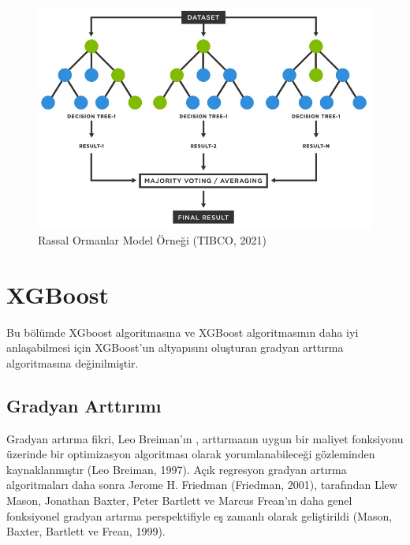 \documentclass[12pt,twoside]{deuthesis}
\begin{document}
\begin{figure}

{\centering \includegraphics[width=1\linewidth,height=0.48\textheight]{figure/rf_example} 

}

\caption{Rassal Ormanlar Model Örneği (TIBCO, 2021)}\label{fig:unnamed-chunk-7}
\end{figure}
\hypertarget{xgboost}{%
\section{XGBoost}\label{xgboost}}

Bu bölümde XGboost algoritmasına ve XGBoost algoritmasının daha iyi anlaşabilmesi için XGBoost'un altyapısını oluşturan gradyan arttırma algoritmasına değinilmiştir.

\hypertarget{gradyan-arttux131rux131mux131}{%
\subsection{Gradyan Arttırımı}\label{gradyan-arttux131rux131mux131}}

Gradyan artırma fikri, Leo Breiman'ın , arttırmanın uygun bir maliyet fonksiyonu üzerinde bir optimizasyon algoritması olarak yorumlanabileceği gözleminden kaynaklanmıştır (Leo Breiman, 1997). Açık regresyon gradyan artırma algoritmaları daha sonra Jerome H. Friedman (Friedman, 2001), tarafından Llew Mason, Jonathan Baxter, Peter Bartlett ve Marcus Frean'ın daha genel fonksiyonel gradyan artırma perspektifiyle eş zamanlı olarak geliştirildi (Mason, Baxter, Bartlett ve Frean, 1999).
\end{document}
